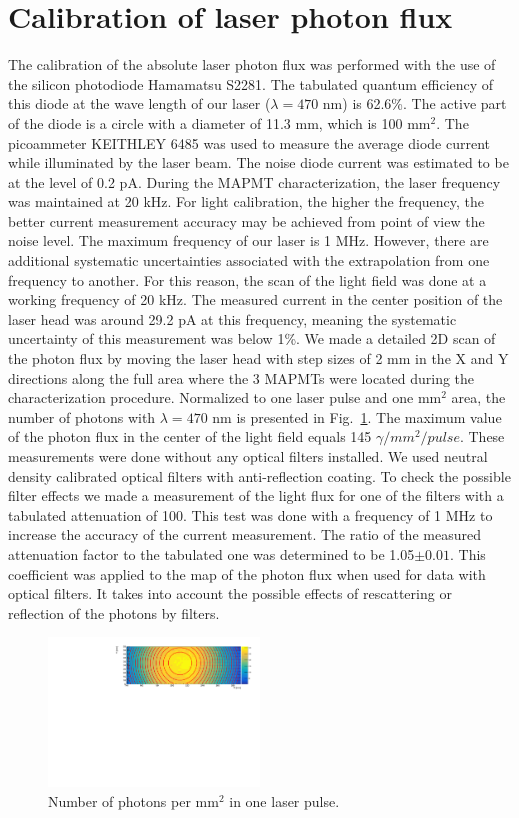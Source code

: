 \section{Calibration of laser photon flux}

The calibration of the absolute laser photon flux was performed with the use of the silicon photodiode Hamamatsu S2281.
The tabulated quantum efficiency of this diode at the wave length of our laser ($\lambda=470$ nm) is 62.6\%. 
The active part of the diode is a circle with a diameter of 11.3 mm, which is 100 mm$^2$. 
The picoammeter KEITHLEY 6485 was used to measure the average diode current while illuminated by the laser beam.
The noise diode current was estimated to be at the level of 0.2 pA. 
During the MAPMT characterization, the laser frequency was maintained at 20 kHz. 
For light calibration, the higher the frequency, the better current measurement accuracy may be achieved from point of view the noise level. 
The maximum frequency of our laser is 1 MHz.
However, there are additional systematic uncertainties associated with the extrapolation from one frequency to another. 
For this reason, the scan of the light field was done at a working frequency of 20 kHz. 
The measured current in the center position of the laser head was around 29.2 pA at this frequency, meaning the systematic uncertainty
of this measurement was below 1\%.  We made a detailed 2D scan of the photon flux by
moving the laser head with step sizes of 2 mm in the X and Y directions along the full area where the 3 MAPMTs were located during the characterization procedure.
Normalized to one laser pulse and one mm$^2$ area, the number of photons with $\lambda=470$ nm  is presented in Fig.~\ref{fig:light_flux}.
The maximum value of the photon flux in the center of the light field equals 145 $\gamma/mm^2/pulse$.
These measurements were done without  any optical filters installed. We used neutral density calibrated optical filters with anti-reflection coating.
To check the possible filter effects we made a measurement of the light flux for one of the filters with a tabulated attenuation of 100. 
This test was done with a frequency of 1 MHz to increase the accuracy of the current measurement. 
The ratio of the measured attenuation factor to the tabulated one was determined to be 1.05$\pm 0.01$. This coefficient was applied to the map of the photon flux when used for data with optical filters. It takes into account the possible effects of rescattering or reflection of the photons by filters.
\begin{figure}[h]
\centering
\includegraphics[width=0.5\textwidth]{figures/photon_flux.pdf}
\caption{Number of photons per mm$^2$ in  one laser pulse.}
\label{fig:light_flux}
\end{figure}

